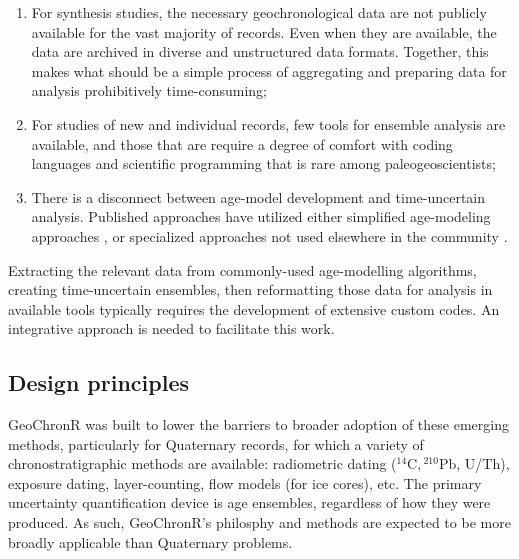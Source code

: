 \documentclass[gchron, manuscript]{copernicus}
\begin{document}
\begin{enumerate}
\def\labelenumi{\arabic{enumi}.}
\item
  For synthesis studies, the necessary geochronological data are not publicly available for the vast majority of records. Even when they are available, the data are archived in diverse and unstructured data formats. Together, this makes what should be a simple process of aggregating and preparing data for analysis prohibitively time-consuming;
\item
  For studies of new and individual records, few tools for ensemble analysis are available, and those that are require a degree of comfort with coding languages and scientific programming that is rare among paleogeoscientists;
\item
  There is a disconnect between age-model development and time-uncertain analysis. Published approaches have utilized either simplified age-modeling approaches \citep{Haam_Huybers2010}, or specialized approaches not used elsewhere in the community \citep[\citet{Anchukaitis_Tierney2012},\citet{Marcott_Science2013},\citet{Tierney2013},\citet{routson2018}]{Shakun_Nature2012}.
\end{enumerate}

Extracting the relevant data from commonly-used age-modelling algorithms, creating time-uncertain ensembles, then reformatting those data for analysis in available tools typically requires the development of extensive custom codes. An integrative approach is needed to facilitate this work.

\subsection{Design principles}

GeoChronR was built to lower the barriers to broader adoption of these emerging methods, particularly for Quaternary records, for which a variety of chronostratigraphic methods are available: radiometric dating (\({}^{14}\mathrm{C}, {}^{210}\mathrm{Pb}\), U/Th), exposure dating, layer-counting, flow models (for ice cores), etc. The primary uncertainty quantification device is age ensembles, regardless of how they were produced. As such, GeoChronR's philosphy and methods are expected to be more broadly applicable than Quaternary problems.
\end{document}
